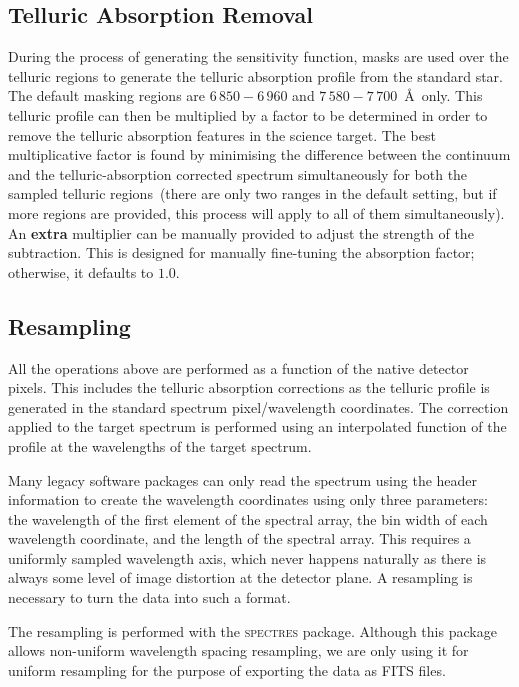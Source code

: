 \documentclass[linenumbers, twocolumn]{aastex631}
\begin{document}
\subsection{Telluric Absorption Removal}
During the process of generating the sensitivity function, masks are used
over the telluric regions to generate the telluric absorption
profile from the standard star. The default masking regions are $6\,850-6\,960$
and $7\,580-7\,700$\ \AA\ only. This telluric profile can then be multiplied
by a factor to be determined in order to remove the telluric absorption
features in the science target. The best multiplicative factor is found
by minimising the difference between the continuum and the telluric-absorption
corrected spectrum simultaneously for both the sampled telluric regions~(there are only two ranges in the default setting, but if more regions are
provided, this process will apply to all of them simultaneously).
An \textbf{extra} multiplier can be manually provided to adjust the
strength of the subtraction. This is designed for manually fine-tuning the
absorption factor; otherwise, it defaults to $1.0$.

\subsection{Resampling}
All the operations above are performed as a function of the native detector
pixels. This includes the telluric absorption corrections as the telluric profile
is generated in the standard spectrum pixel/wavelength coordinates. The
correction applied to the target spectrum is performed using an interpolated
function of the profile at the wavelengths of the target spectrum. 

Many legacy
software packages can only read the spectrum using the header information to create
the wavelength coordinates using only three parameters: the wavelength of the
first element of the spectral array, the bin width of each wavelength
coordinate, and the length of the spectral array. This requires a uniformly
sampled wavelength axis, which never happens naturally as there is always some
level of image distortion at the detector plane. A resampling is necessary
to turn the data into such a format.

The resampling is performed with the \textsc{spectres} package. Although
this package allows non-uniform wavelength spacing resampling, we are only
using it for uniform resampling for the purpose of exporting the data as FITS
files.
\end{document}
